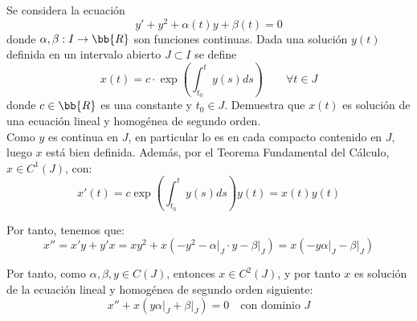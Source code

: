\begin{ejercicio}\label{ej:4.7}
    Se considera la ecuación
    \[
        y' + y^2 + \alpha(t)y + \beta(t) = 0
    \]
    donde $\alpha, \beta : I \to \bb{R}$ son funciones continuas. Dada una solución $y(t)$ definida en un intervalo abierto $J \subset I$ se define
    \[
        x(t) = c\cdot \exp\left(\int_{t_0}^t y(s)ds\right)\qquad \forall t \in J
    \]
    donde $c\in \bb{R}$ es una constante y $t_0 \in J$. Demuestra que $x(t)$ es solución de una ecuación lineal y homogénea de segundo orden.\\

    Como $y$ es continua en $J$, en particular lo es en cada compacto contenido en $J$, luego $x$ está bien definida. Además, por el Teorema Fundamental del Cálculo, $x\in C^1(J)$, con:
    \begin{equation*}
        x'(t)=c\exp\left(\int_{t_0}^t y(s)ds\right)y(t)=x(t)y(t)
    \end{equation*}

    Por tanto, tenemos que:
    \begin{equation*}
        x''=x'y+y'x=xy^2 + x\left(-y^2-\alpha\big|_J\cdot y-\beta\big|_J\right)=x\left(-y\alpha\big|_J-\beta\big|_J\right)
    \end{equation*}

    Por tanto, como $\alpha,\beta,y\in C(J)$, entonces $x\in C^2(J)$, y por tanto $x$ es solución de la ecuación lineal y homogénea de segundo orden siguiente:
    \begin{equation*}
        x''+x\left(y\alpha\big|_J+\beta\big|_J\right)=0 \quad \text{con dominio } J
    \end{equation*}
\end{ejercicio}

